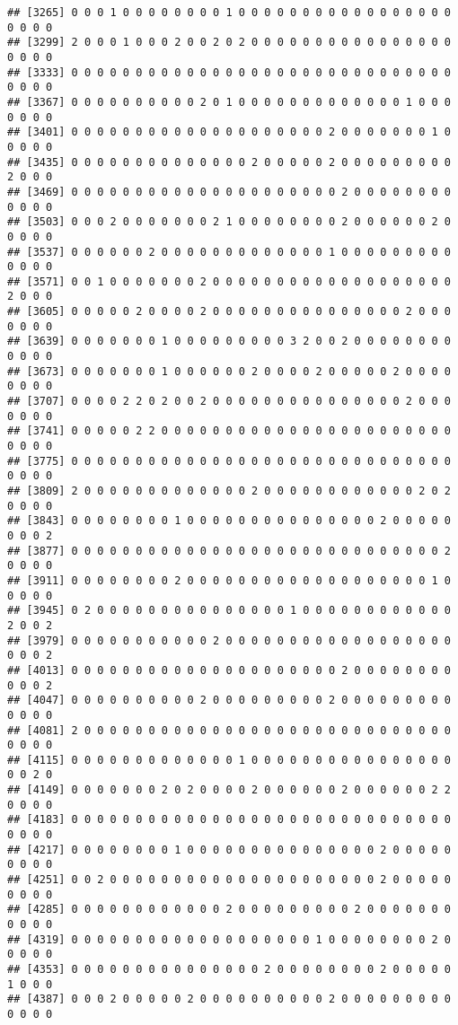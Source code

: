 \documentclass[12pt,]{article}
\begin{document}
\begin{verbatim}
## [3265] 0 0 0 1 0 0 0 0 0 0 0 0 1 0 0 0 0 0 0 0 0 0 0 0 0 0 0 0 0 0 0 0 0 0
## [3299] 2 0 0 0 1 0 0 0 2 0 0 2 0 2 0 0 0 0 0 0 0 0 0 0 0 0 0 0 0 0 0 0 0 0
## [3333] 0 0 0 0 0 0 0 0 0 0 0 0 0 0 0 0 0 0 0 0 0 0 0 0 0 0 0 0 0 0 0 0 0 0
## [3367] 0 0 0 0 0 0 0 0 0 0 2 0 1 0 0 0 0 0 0 0 0 0 0 0 0 0 1 0 0 0 0 0 0 0
## [3401] 0 0 0 0 0 0 0 0 0 0 0 0 0 0 0 0 0 0 0 0 2 0 0 0 0 0 0 0 1 0 0 0 0 0
## [3435] 0 0 0 0 0 0 0 0 0 0 0 0 0 0 2 0 0 0 0 0 2 0 0 0 0 0 0 0 0 0 2 0 0 0
## [3469] 0 0 0 0 0 0 0 0 0 0 0 0 0 0 0 0 0 0 0 0 0 2 0 0 0 0 0 0 0 0 0 0 0 0
## [3503] 0 0 0 2 0 0 0 0 0 0 0 2 1 0 0 0 0 0 0 0 0 2 0 0 0 0 0 0 2 0 0 0 0 0
## [3537] 0 0 0 0 0 0 2 0 0 0 0 0 0 0 0 0 0 0 0 0 1 0 0 0 0 0 0 0 0 0 0 0 0 0
## [3571] 0 0 1 0 0 0 0 0 0 0 2 0 0 0 0 0 0 0 0 0 0 0 0 0 0 0 0 0 0 0 2 0 0 0
## [3605] 0 0 0 0 0 2 0 0 0 0 2 0 0 0 0 0 0 0 0 0 0 0 0 0 0 0 2 0 0 0 0 0 0 0
## [3639] 0 0 0 0 0 0 0 1 0 0 0 0 0 0 0 0 0 3 2 0 0 2 0 0 0 0 0 0 0 0 0 0 0 0
## [3673] 0 0 0 0 0 0 0 1 0 0 0 0 0 0 2 0 0 0 0 2 0 0 0 0 0 2 0 0 0 0 0 0 0 0
## [3707] 0 0 0 0 2 2 0 2 0 0 2 0 0 0 0 0 0 0 0 0 0 0 0 0 0 0 2 0 0 0 0 0 0 0
## [3741] 0 0 0 0 0 2 2 0 0 0 0 0 0 0 0 0 0 0 0 0 0 0 0 0 0 0 0 0 0 0 0 0 0 0
## [3775] 0 0 0 0 0 0 0 0 0 0 0 0 0 0 0 0 0 0 0 0 0 0 0 0 0 0 0 0 0 0 0 0 0 0
## [3809] 2 0 0 0 0 0 0 0 0 0 0 0 0 0 2 0 0 0 0 0 0 0 0 0 0 0 0 2 0 2 0 0 0 0
## [3843] 0 0 0 0 0 0 0 0 1 0 0 0 0 0 0 0 0 0 0 0 0 0 0 0 2 0 0 0 0 0 0 0 0 2
## [3877] 0 0 0 0 0 0 0 0 0 0 0 0 0 0 0 0 0 0 0 0 0 0 0 0 0 0 0 0 0 2 0 0 0 0
## [3911] 0 0 0 0 0 0 0 0 2 0 0 0 0 0 0 0 0 0 0 0 0 0 0 0 0 0 0 0 1 0 0 0 0 0
## [3945] 0 2 0 0 0 0 0 0 0 0 0 0 0 0 0 0 0 1 0 0 0 0 0 0 0 0 0 0 0 0 2 0 0 2
## [3979] 0 0 0 0 0 0 0 0 0 0 0 2 0 0 0 0 0 0 0 0 0 0 0 0 0 0 0 0 0 0 0 0 0 2
## [4013] 0 0 0 0 0 0 0 0 0 0 0 0 0 0 0 0 0 0 0 0 0 2 0 0 0 0 0 0 0 0 0 0 0 2
## [4047] 0 0 0 0 0 0 0 0 0 0 2 0 0 0 0 0 0 0 0 0 2 0 0 0 0 0 0 0 0 0 0 0 0 0
## [4081] 2 0 0 0 0 0 0 0 0 0 0 0 0 0 0 0 0 0 0 0 0 0 0 0 0 0 0 0 0 0 0 0 0 0
## [4115] 0 0 0 0 0 0 0 0 0 0 0 0 0 1 0 0 0 0 0 0 0 0 0 0 0 0 0 0 0 0 0 0 2 0
## [4149] 0 0 0 0 0 0 0 2 0 2 0 0 0 0 2 0 0 0 0 0 0 2 0 0 0 0 0 0 2 2 0 0 0 0
## [4183] 0 0 0 0 0 0 0 0 0 0 0 0 0 0 0 0 0 0 0 0 0 0 0 0 0 0 0 0 0 0 0 0 0 0
## [4217] 0 0 0 0 0 0 0 0 1 0 0 0 0 0 0 0 0 0 0 0 0 0 0 0 2 0 0 0 0 0 0 0 0 0
## [4251] 0 0 2 0 0 0 0 0 0 0 0 0 0 0 0 0 0 0 0 0 0 0 0 0 2 0 0 0 0 0 0 0 0 0
## [4285] 0 0 0 0 0 0 0 0 0 0 0 0 2 0 0 0 0 0 0 0 0 0 2 0 0 0 0 0 0 0 0 0 0 0
## [4319] 0 0 0 0 0 0 0 0 0 0 0 0 0 0 0 0 0 0 0 1 0 0 0 0 0 0 0 0 2 0 0 0 0 0
## [4353] 0 0 0 0 0 0 0 0 0 0 0 0 0 0 0 2 0 0 0 0 0 0 0 0 2 0 0 0 0 0 1 0 0 0
## [4387] 0 0 0 2 0 0 0 0 0 2 0 0 0 0 0 0 0 0 0 0 2 0 0 0 0 0 0 0 0 0 0 0 0 0

\end{verbatim}
\end{document}
